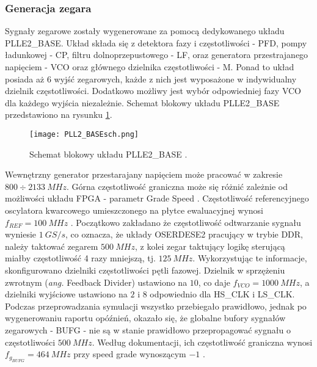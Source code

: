        \subsubsection{Generacja zegara}
            Sygnały zegarowe zostały wygenerowane za pomocą dedykowanego układu PLLE2\_BASE. Układ składa się z detektora fazy i 
            częstotliwości - PFD, pompy ładunkowej - CP, filtru dolnoprzepustowego - LF, oraz generatora przestrajanego napięciem - VCO
            oraz głównego dzielnika częstotliwości - M. Ponad to układ posiada aż 6 wyjść zegarowych, każde z nich jest wyposażone 
            w indywidualny dzielnik częstotliwości. Dodatkowo możliwy jest wybór odpowiedniej fazy VCO dla każdego wyjścia niezależnie. 
            Schemat blokowy układu PLLE2\_BASE przedstawiono na rysunku \ref{sch:PLLE2_BASE}.
            \begin{figure}[!ht]
                \centering
                \texttt{[image: PLL2\_BASEsch.png]}
                \caption{Schemat blokowy układu PLLE2\_BASE \cite{FPGA_Clocking}.}
                \label{sch:PLLE2_BASE}
            \end{figure}
            Wewnętrzny generator przestarajany napięciem może pracować w zakresie $800 \div 2133 \ MHz$. 
            Górna częstotliwość graniczna może się różnić zależnie od możliwości układu FPGA - parametr Grade 
            Speed \cite{Zynq_7000_DC_AC}. Częstotliwość referencyjnego oscylatora kwarcowego umieszczonego na płytce ewaluacyjnej 
            wynosi $f_{REF} = 100\ MHz$ \cite{ZedBoard}. Początkowo zakładano że częstotliwość odtwarzanie sygnału wyniesie $1\ GS/s$, 
            co oznacza, że układy OSERDESE2 pracujący w trybie DDR, należy taktować zegarem $500\ MHz$, z kolei zegar taktujący 
            logikę sterującą miałby częstotliwość 4 razy mniejszą, tj. $125 \ MHz$. Wykorzystując te informacje, skonfigurowano 
            dzielniki częstotliwości pętli fazowej. Dzielnik w sprzężeniu zwrotnym (\textit{ang.} Feedback Divider) ustawiono na $10$, 
            co daje $f_{VCO} = 1000 \ MHz$, a dzielniki wyjściowe ustawiono na $2$ i $8$ odpowiednio dla HS\_CLK i LS\_CLK. 
            Podczas przeprowadzania symulacji wszystko przebiegało prawidłowo, jednak po wygenerowaniu raportu opóźnień, okazało się, 
            że globalne bufory sygnałów zegarowych - BUFG -  nie są w stanie prawidłowo przepropagować sygnału o częstotliwości $500 \ MHz$. 
            Według dokumentacji, ich częstotliwość graniczna wynosi $f_{g_{BUFG}} = 464 \ MHz$ przy speed grade wynoszącym $-1$ \cite{Zynq_7000_DC_AC}. 
